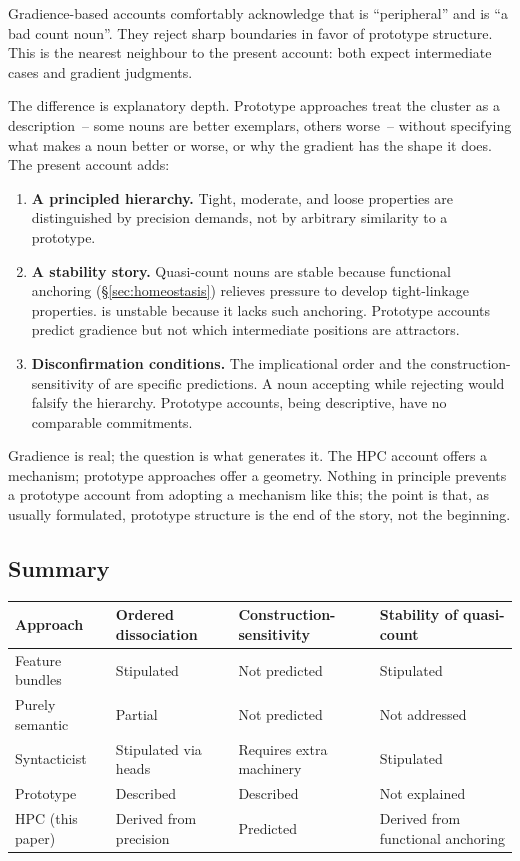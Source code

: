 \documentclass[12pt,a4paper]{article}
\begin{document}
Gradience-based accounts \citep{taylor2003} comfortably acknowledge that  is \enquote{peripheral} and  is \enquote{a bad count noun}. They reject sharp boundaries in favor of prototype structure. This is the nearest neighbour to the present account: both expect intermediate cases and gradient judgments.

The difference is explanatory depth. Prototype approaches treat the cluster as a description~-- some nouns are better exemplars, others worse~-- without specifying what makes a noun better or worse, or why the gradient has the shape it does. The present account adds:

\begin{enumerate}
\item \textbf{A principled hierarchy.} Tight, moderate, and loose properties are distinguished by precision demands, not by arbitrary similarity to a prototype.
\item \textbf{A stability story.} Quasi-count nouns are stable because functional anchoring (\S\ref{sec:homeostasis}) relieves pressure to develop tight-linkage properties.  is unstable because it lacks such anchoring. Prototype accounts predict gradience but not which intermediate positions are attractors.
\item \textbf{Disconfirmation conditions.} The implicational order and the construction-sensitivity of  are specific predictions. A noun accepting  while rejecting  would falsify the hierarchy. Prototype accounts, being descriptive, have no comparable commitments.
\end{enumerate}

Gradience is real; the question is what generates it. The HPC account offers a mechanism; prototype approaches offer a geometry. Nothing in principle prevents a prototype account from adopting a mechanism like this; the point is that, as usually formulated, prototype structure is the end of the story, not the beginning.

\subsection{Summary}

\begin{table}[H]
\centering
\begin{tabular}{@{}l p{3.2cm} p{3.2cm} p{3.2cm}@{}}
\toprule
Approach & Ordered dissociation & Construction-sensitivity & Stability of quasi-count \\
\midrule
Feature bundles & Stipulated & Not predicted & Stipulated \\
Purely semantic & Partial & Not predicted & Not addressed \\
Syntacticist & Stipulated via heads & Requires extra machinery & Stipulated \\
Prototype & Described & Described & Not explained \\
HPC (this paper) & Derived from precision & Predicted & Derived from functional anchoring \\
\bottomrule
\end{tabular}
\end{table}
\end{document}
